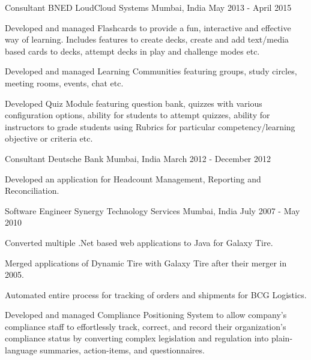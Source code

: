 \begin{cventries}
  \cventry
    {Consultant} %
    {BNED LoudCloud Systems} %
    {Mumbai, India} %
    {May 2013 - April 2015} %
    {
      \begin{cvitems} %
        \item {Developed and managed Flashcards to provide a fun, interactive and effective way of learning. Includes features to create decks, create and add text/media based cards to decks, attempt decks in play and challenge modes etc.}
        \item {Developed and managed Learning Communities featuring groups, study circles, meeting rooms, events, chat etc.}
        \item {Developed Quiz Module featuring question bank, quizzes with various configuration options, ability for students to attempt quizzes, ability for instructors to grade students using Rubrics for particular competency/learning objective or criteria etc.}
      \end{cvitems}
    }

  \cventry
    {Consultant} %
    {Deutsche Bank} %
    {Mumbai, India} %
    {March 2012 - December 2012} %
    {
      \begin{cvitems} %
        \item {Developed an application for Headcount Management, Reporting and Reconciliation.}
      \end{cvitems}
    }

  \cventry
    {Software Engineer} %
    {Synergy Technology Services} %
    {Mumbai, India} %
    {July 2007 - May 2010} %
    {
      \begin{cvitems} %
        \item {Converted multiple .Net based web applications to Java for Galaxy Tire.}
        \item {Merged applications of Dynamic Tire with Galaxy Tire after their merger in 2005.}
        \item {Automated entire process for tracking of orders and shipments for BCG Logistics.}
        \item {Developed and managed Compliance Positioning System to allow company’s compliance staff to effortlessly track, correct, and record their organization’s compliance status by converting complex legislation and regulation into plain-language summaries, action-items, and questionnaires.}
      \end{cvitems}
    }


\end{cventries}
